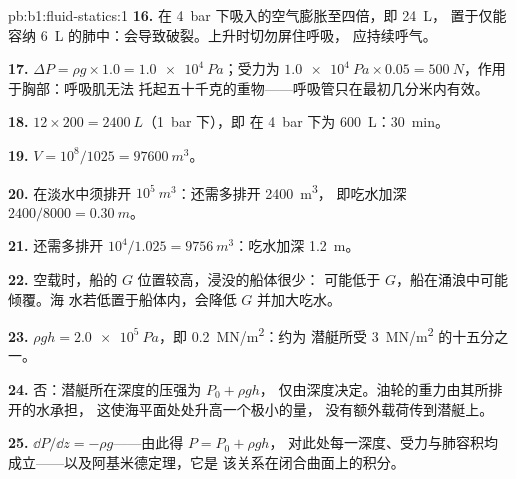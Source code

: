 \begin{solution}{pb:b1:fluid-statics:1}
\textbf{16.} 在 \qty{4}{bar} 下吸入的空气膨胀至四倍，即 \qty{24}{L}，
置于仅能容纳 \qty{6}{L} 的肺中：会导致破裂。上升时切勿屏住呼吸，
应持续呼气。

\textbf{17.} $\Delta P = \rho g \times 1.0 = \qty{1.0e4}{Pa}$；受力为 $\qty{1.0e4}{Pa}
\times 0.05 = \qty{500}{N}$，作用于胸部：呼吸肌无法
托起五十千克的重物——呼吸管只在最初几分米内有效。

\textbf{18.} $12 \times 200 = \qty{2400}{L}$（\qty{1}{bar} 下），即
在 \qty{4}{bar} 下为 \qty{600}{L}：\qty{30}{min}。

\textbf{19.} $V = 10^8/1025 = \qty{97600}{m^3}$。

\textbf{20.} 在淡水中须排开 $10^5\ \unit{m^3}$：还需多排开 \qty{2400}{m^3}，
即吃水加深 $2400/8000 = \qty{0.30}{m}$。

\textbf{21.} 还需多排开 $10^4/1.025 = \qty{9756}{m^3}$：吃水加深 \qty{1.2}{m}。

\textbf{22.} 空载时，船的 $G$ 位置较高，浸没的船体很少：
可能低于 $G$，船在涌浪中可能倾覆。海
水若低置于船体内，会降低 $G$ 并加大吃水。

\textbf{23.} $\rho gh = \qty{2.0e5}{Pa}$，即 \qty{0.2}{MN/m^2}：约为
潜艇所受 \qty{3}{MN/m^2} 的十五分之一。

\textbf{24.} 否：潜艇所在深度的压强为 $P_0 + \rho gh$，
仅由深度决定。油轮的重力由其所排开的水承担，
这使海平面处处升高一个极小的量，
没有额外载荷传到潜艇上。

\textbf{25.} $\dd P/\dd z = -\rho g$——由此得 $P = P_0 + \rho gh$，
对此处每一深度、受力与肺容积均成立——以及阿基米德定理，它是
该关系在闭合曲面上的积分。
\end{solution}
